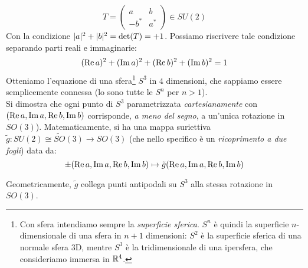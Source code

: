 \documentclass[../../FisicaTeorica.tex]{subfiles}
\begin{document}
\[
T =
\begin{pmatrix}
a & b\\
-b^* & a^*
\end{pmatrix} \in SU(2)
\]
Con la condizione $|a|^2 + |b|^2 = \operatorname{det}(T) = +1$. Possiamo riscrivere tale condizione separando parti reali e immaginarie:
\[
(\operatorname{Re} a)^2 + (\operatorname{Im} a)^2 + (\operatorname{Re} b)^2 + (\operatorname{Im} b)^2 = 1
\]
Otteniamo l'equazione di una sfera\footnote{Con sfera intendiamo sempre la \textit{superficie sferica}. $S^n$ è quindi la superficie $n$-dimensionale di una sfera in $n+1$ dimensioni: $S^2$ è la superficie sferica di una normale sfera 3D, mentre $S^3$ è la  tridimensionale di una ipersfera, che consideriamo immersa in $\mathbb{R}^4$.} $S^3$ in $4$ dimensioni, che sappiamo essere semplicemente connessa (lo sono tutte le $S^n$ per $n>1$).\\

Si dimostra che ogni punto di $S^3$ parametrizzata \textit{cartesianamente} con $(\operatorname{Re}a, \operatorname{Im}a, \operatorname{Re}b, \operatorname{Im}b)$ corrisponde, \textit{a meno del segno}, a un'unica rotazione in $SO(3)$). Matematicamente, si ha una mappa suriettiva $\tilde{g}: SU(2) \cong \tilde{SO}(3) \to SO(3)$ (che nello specifico è un \textit{ricoprimento a due fogli}) data da:
\[
\pm (\operatorname{Re}a, \operatorname{Im}a, \operatorname{Re}b, \operatorname{Im}b) \mapsto \tilde{g}(\operatorname{Re}a, \operatorname{Im}a, \operatorname{Re}b, \operatorname{Im}b)
\]

Geometricamente, $\tilde{g}$ collega punti antipodali su $S^3$ alla stessa rotazione in $SO(3)$.\\
\end{document}
